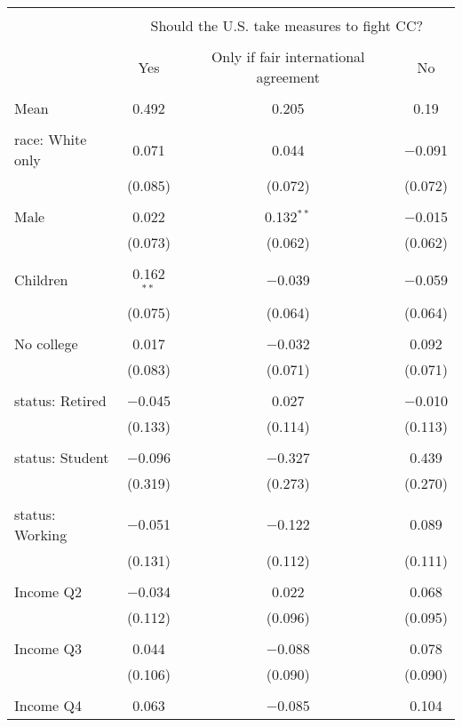 
\begin{tabular}{@{\extracolsep{5pt}}lccc} 
\\[-1.8ex]\hline 
\hline \\[-1.8ex] 
 & \multicolumn{3}{c}{Should the U.S. take measures to fight CC?} \\ 
\cline{2-4} 
\\[-1.8ex] & Yes & Only if fair international agreement & No \\ 
\hline \\[-1.8ex] 
 Mean & 0.492 & 0.205 & 0.19  \\ \hline \\[-1.8ex] race: White only & 0.071 & 0.044 & $-$0.091 \\ 
  & (0.085) & (0.072) & (0.072) \\ 
  & & & \\ 
 Male & 0.022 & 0.132$^{**}$ & $-$0.015 \\ 
  & (0.073) & (0.062) & (0.062) \\ 
  & & & \\ 
 Children & 0.162$^{**}$ & $-$0.039 & $-$0.059 \\ 
  & (0.075) & (0.064) & (0.064) \\ 
  & & & \\ 
 No college & 0.017 & $-$0.032 & 0.092 \\ 
  & (0.083) & (0.071) & (0.071) \\ 
  & & & \\ 
 status: Retired & $-$0.045 & 0.027 & $-$0.010 \\ 
  & (0.133) & (0.114) & (0.113) \\ 
  & & & \\ 
 status: Student & $-$0.096 & $-$0.327 & 0.439 \\ 
  & (0.319) & (0.273) & (0.270) \\ 
  & & & \\ 
 status: Working & $-$0.051 & $-$0.122 & 0.089 \\ 
  & (0.131) & (0.112) & (0.111) \\ 
  & & & \\ 
 Income Q2 & $-$0.034 & 0.022 & 0.068 \\ 
  & (0.112) & (0.096) & (0.095) \\ 
  & & & \\ 
 Income Q3 & 0.044 & $-$0.088 & 0.078 \\ 
  & (0.106) & (0.090) & (0.090) \\ 
  & & & \\ 
 Income Q4 & 0.063 & $-$0.085 & 0.104 \\ 

\end{tabular}
